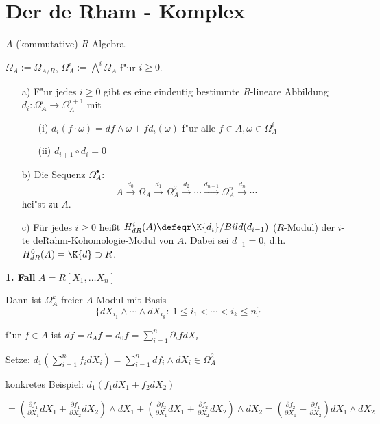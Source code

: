 \section{Der de Rham - Komplex}

$A$ (kommutative) $R$-Algebra.

$\Omega_A := \Omega_{A/R}$, $\Omega^i_A := \bigwedge\nolimits^i\Omega_A$ f"ur $i \geq 0$.

\begin{SatzDef}
\begin{enumerate}
\item[a)] F"ur jedes $i \geq 0$ gibt es eine eindeutig bestimmte $R$-lineare Abbildung $d_i : \Omega^i_A \rightarrow \Omega^{i+1}_A$ mit
\begin{enumerate}
\item[(i)] $d_i(f \cdot \omega) = df \wedge \omega + f d_i(\omega)$ f"ur alle $f \in A, \omega \in \Omega^i_A$
\item[(ii)] $d_{i+1} \circ d_i = 0$
\end{enumerate}

\item[b)]
Die Sequenz $\Omega^\bullet_A$:
$$A \overset{d_0}{\rightarrow} \Omega_A \overset{d_1}{\rightarrow} \Omega^2_A \overset{d_2}{\rightarrow} \cdots \overset{d_{n-1}}{\rightarrow} \Omega^n_A  \overset{d_n}{\rightarrow} \cdots$$
hei"st  zu $A$.

\item[c)]
F\"ur jedes $i\geq 0$ hei\ss t $H_{dR}^i(A)\defeqr \K{d_i}/Bild(d_{i-1})$ ($R$-Modul)
der $i$-te deRahm-Kohomologie-Modul von $A$. Dabei sei $d_{-1}=0$, d.h. $H_{dR}^0(A)=\K{d}\supset R$.

\end{enumerate}

\begin{Bew}
\textbf{1. Fall} $A = R[X_1, \ldots X_n]$

Dann ist $\Omega^k_A$ freier $A$-Modul mit Basis
\[
\{d X_{i_1} \wedge \cdots \wedge d X_{i_k}:\ 1 \leq i_1 < \cdots < i_k \leq n\}
\]

f"ur $f \in A$ ist $df = d_A f = d_0 f = \sum_{i=1}^n \partial_i f d X_i$

Setze: $d_1(\sum_{i=1}^n f_i d X_i) = \sum_{i=1}^n d f_i \wedge d X_i \in \Omega^2_A$

konkretes Beispiel: $d_1(f_1 dX_1 + f_2 dX_2)$

$= (\frac{\partial f_1}{\partial X_1} dX_1 + \frac{\partial f_1}{\partial X_2} dX_2) \wedge dX_1 + (\frac{\partial f_2}{\partial X_1} dX_1 + \frac{\partial f_2}{\partial X_2} dX_2) \wedge dX_2 = (\frac{\partial f_2}{\partial X_1} - \frac{\partial f_1}{\partial X_2}) dX_1 \wedge dX_2$


\end{Bew}
\end{SatzDef}
